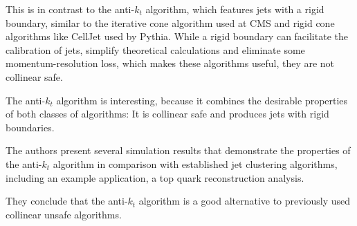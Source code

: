 This is in contrast to the anti-$k_t$ algorithm, which features jets with a rigid boundary, similar to the iterative cone algorithm used at CMS and rigid cone algorithms like CellJet used by Pythia.
While a rigid boundary can facilitate the calibration of jets, simplify theoretical calculations and eliminate some momentum-resolution loss, which makes these algorithms useful, they are not collinear safe.

The anti-$k_t$ algorithm is interesting, because it combines the desirable properties of both classes of algorithms: It is collinear safe and produces jets with rigid boundaries.

The authors present several simulation results that demonstrate the properties of the anti-$k_t$ algorithm in comparison with established jet clustering algorithms, including an example application, a top quark reconstruction analysis.

They conclude that the anti-$k_t$ algorithm is a good alternative to previously used collinear unsafe algorithms.
